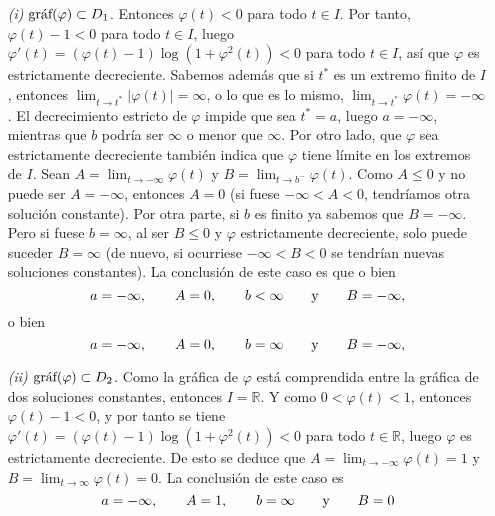 \documentclass[11pt]{report}
\newcommand{\R}{\mathbb R}
\begin{document}
\begin{itemize}
    \item[\textit{(i)}] $\textup{gráf}(\varphi) \subset D_1$. Entonces $\varphi(t) <0$ para todo $t \in I$. Por tanto, $\varphi(t)-1 <0$ para todo $t \in I$, luego $\varphi'(t)= (\varphi(t)-1)\log(1+\varphi^2(t)) <0$ para todo $t \in I$, así que $\varphi$ es estrictamente decreciente. Sabemos además que si $t^*$ es un extremo finito de $I$, entonces $\lim_{t \to t^*} |\varphi(t)| = \infty$, o lo que es lo mismo, $\lim_{t \to t^*} \varphi(t) = -\infty$. El decrecimiento estricto de $\varphi$ impide que sea $t^* = a$, luego $a = -\infty$, mientras que $b$ podría ser $\infty$ o menor que $\infty$. Por otro lado, que $\varphi$ sea estrictamente decreciente también indica que $\varphi$ tiene límite en los extremos de $I$. Sean $A =\lim_{t \to -\infty} \varphi(t)$ y $B = \lim_{t \to b^-} \varphi(t)$. Como $A \leq 0$ y no puede ser $A=-\infty$, entonces $A = 0$ (si fuese $-\infty<A<0$, tendríamos otra solución constante). Por otra parte, si $b$ es finito ya sabemos que $B = -\infty$. Pero si fuese $b=\infty$, al ser $B \leq 0$ y $\varphi$ estrictamente decreciente, solo puede suceder $B = \infty$ (de nuevo, si ocurriese $-\infty<B<0$ se tendrían nuevas soluciones constantes). La conclusión de este caso es que o bien
    \[a=-\infty, \qquad A = 0, \qquad b < \infty \qquad \textup{y} \qquad B = -\infty,\]
    o bien
    \[a=-\infty, \qquad A = 0, \qquad b = \infty \qquad \textup{y} \qquad B = -\infty,\]
    \item[\textit{(ii)}] $\textup{gráf}(\varphi) \subset D_2$. Como la gráfica de $\varphi$ está comprendida entre la gráfica de dos soluciones constantes, entonces $I = \R$. Y como $0 < \varphi(t) < 1$, entonces $\varphi(t)-1<0$, y por tanto se tiene $\varphi'(t) = (\varphi(t)-1)\log(1+\varphi^2(t))<0$ para todo $t \in \R$, luego $\varphi$ es estrictamente decreciente. De esto se deduce que $A = \lim_{t \to -\infty} \varphi(t)=1$ y $B = \lim_{t \to \infty} \varphi(t) = 0$. La conclusión de este caso es
    \[a=-\infty, \qquad A = 1, \qquad b = \infty \qquad \textup{y} \qquad B = 0\]

\end{itemize}
\end{document}
